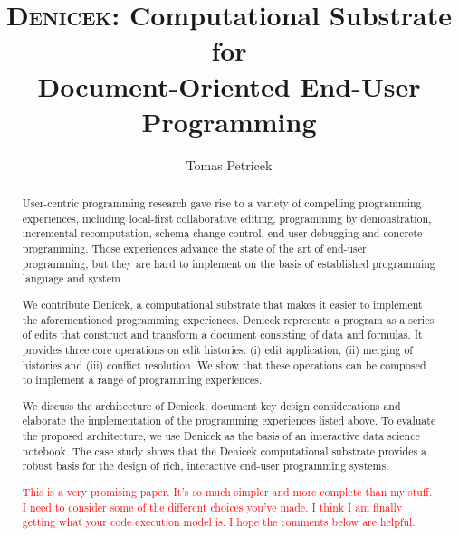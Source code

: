 \documentclass[sigconf,anonymous,screen]{acmart}
\newcommand{\note}[1]{\textcolor{red}{#1}}
\begin{document}
\title[Denicek: Computational Substrate for Document-Oriented End-User
  Programming]{{\scshape Denicek}: Computational Substrate for\\ Document-Oriented End-User Programming}

\author{Tomas Petricek}

\begin{abstract}
User-centric programming research gave rise to a variety of compelling programming experiences,
including local-first collaborative editing, programming by demonstration, incremental
recomputation, schema change control, end-user debugging and concrete programming.
Those experiences advance the state of the art of end-user programming, but they are hard to
implement on the basis of established programming language and system.

We contribute Denicek, a computational substrate that makes it easier to
implement the aforementioned programming experiences. Denicek represents a program as a series of edits
that construct and transform a document consisting of data and formulas. It provides three
core operations on edit histories: (i) edit application, (ii) merging of histories and (iii) conflict resolution.
We show that these operations can be composed to implement a range of programming experiences.

We discuss the architecture of Denicek, document key design considerations and elaborate
the implementation of the programming experiences listed above. To evaluate the proposed
architecture, we use Denicek as the basis of an interactive data science notebook.
The case study shows that the Denicek computational substrate provides a robust basis for the
design of rich, interactive end-user programming systems.

\note{This is a very promising paper. It's so much simpler and more complete than my stuff. I need to consider some of the different choices you've made. I think I am finally getting what your code execution model is. I hope the comments below are helpful.}
\end{abstract}
%

\maketitle
\end{document}
